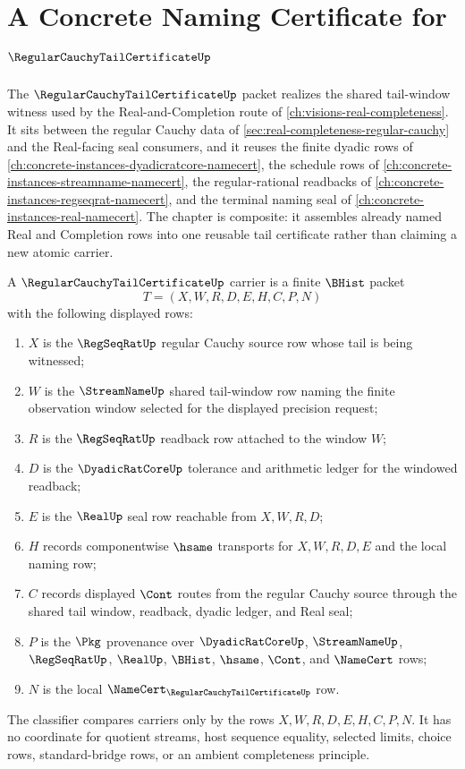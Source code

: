 \chapter{A Concrete Naming Certificate for $\RegularCauchyTailCertificateUp$}
\label{ch:concrete-instances-regular-cauchy-tail-certificate-namecert}

The $\RegularCauchyTailCertificateUp$ packet realizes the shared tail-window witness used by the Real-and-Completion route of \autoref{ch:visions-real-completeness}. It sits between the regular Cauchy data of \autoref{sec:real-completeness-regular-cauchy} and the Real-facing seal consumers, and it reuses the finite dyadic rows of \autoref{ch:concrete-instances-dyadicratcore-namecert}, the schedule rows of \autoref{ch:concrete-instances-streamname-namecert}, the regular-rational readbacks of \autoref{ch:concrete-instances-regseqrat-namecert}, and the terminal naming seal of \autoref{ch:concrete-instances-real-namecert}. The chapter is composite: it assembles already named Real and Completion rows into one reusable tail certificate rather than claiming a new atomic carrier.

\begin{definition}
\label{def:regular-cauchy-tail-certificate-carrier}
A $\RegularCauchyTailCertificateUp$ carrier is a finite $\BHist$ packet
$$
T=(X,W,R,D,E,H,C,P,N)
$$
with the following displayed rows:
\begin{enumerate}
\item $X$ is the $\RegSeqRatUp$ regular Cauchy source row whose tail is being witnessed;
\item $W$ is the $\StreamNameUp$ shared tail-window row naming the finite observation window selected for the displayed precision request;
\item $R$ is the $\RegSeqRatUp$ readback row attached to the window $W$;
\item $D$ is the $\DyadicRatCoreUp$ tolerance and arithmetic ledger for the windowed readback;
\item $E$ is the $\RealUp$ seal row reachable from $X,W,R,D$;
\item $H$ records componentwise $\hsame$ transports for $X,W,R,D,E$ and the local naming row;
\item $C$ records displayed $\Cont$ routes from the regular Cauchy source through the shared tail window, readback, dyadic ledger, and Real seal;
\item $P$ is the $\Pkg$ provenance over $\DyadicRatCoreUp$, $\StreamNameUp$, $\RegSeqRatUp$, $\RealUp$, $\BHist$, $\hsame$, $\Cont$, and $\NameCert$ rows;
\item $N$ is the local $\NameCert_{\RegularCauchyTailCertificateUp}$ row.
\end{enumerate}
The classifier compares carriers only by the rows $X,W,R,D,E,H,C,P,N$. It has no coordinate for quotient streams, host sequence equality, selected limits, choice rows, standard-bridge rows, or an ambient completeness principle.
\end{definition}

